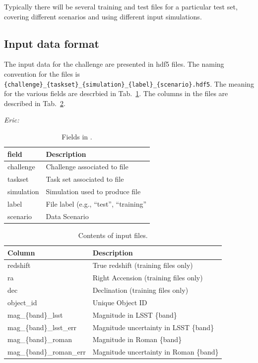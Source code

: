 \documentclass[modern]{desc-tex/styles/lsstdescnote}
\newcommand{\eac}[1]{{\em Eric:  }{\color{red}{#1}}}
\begin{document}
Typically there will be several training and test files for a
particular test set, covering different scenarios and using different
input simulations.


\subsection{Input data format}

The input data for the challenge are presented in hdf5 files.
The naming convention for the files is
\texttt{\{challenge\}\_\{taskset\}\_\{simulation\}\_\{label\}\_\{scenario\}.hdf5}.
The meaning for the various fields are descrbied in
Tab.~\ref{tab:file_fields}.   The columns in the files are described
in Tab.~\ref{tab:columns}.

\eac{Do we mention tables\_io for conversion}


\begin{table}[ht]
\centering
\caption{\label{tab:file_fields}\small Fields in .}
\begin{tabular}{ll}
  \hline\hline  
  field & Description \\ \hline
  challenge & Challenge associated to file \\
  taskset & Task set associated to file \\
  simulation & Simulation used to produce file \\
  label & File label (e.g., ``test'', ``training'' \\
  scenario & Data Scenario \\
\hline\hline
\end{tabular}
\end{table}


\begin{table}[ht]
\centering
\caption{\label{tab:columns}\small Contents of input files.}
\begin{tabular}{ll}
  \hline\hline
  Column & Description \\ \hline  
  redshift & True redshift (training files only) \\
  ra & Right Accension (training files only) \\
  dec & Declination (training files only) \\
  object\_id & Unique Object ID\\
  mag\_\{band\}\_lsst & Magnitude in LSST \{band\} \\
  mag\_\{band\}\_lsst\_err & Magnitude uncertainty in LSST \{band\} \\
  mag\_\{band\}\_roman & Magnitude in Roman \{band\} \\
  mag\_\{band\}\_roman\_err & Magnitude uncertainty in Roman \{band\} \\
\hline\hline
\end{tabular}
\end{table}
\end{document}
